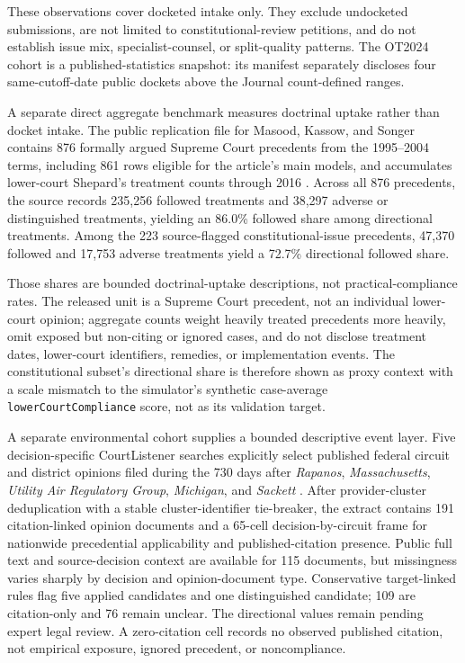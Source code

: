 \documentclass[
    journal=jlc,
    manuscript=research-article,
    year=2026,
  ]{cup-journal}
\newcommand{\jlcite}[1]{\autocite{#1}}
\newcommand{\jlcite}[1]{\citep{#1}}
\begin{document}


These observations cover docketed intake only. They exclude undocketed submissions, are not limited to constitutional-review petitions, and do not establish issue mix, specialist-counsel, or split-quality patterns. The OT2024 cohort is a published-statistics snapshot: its manifest separately discloses four same-cutoff-date public dockets above the Journal count-defined ranges.

A separate direct aggregate benchmark measures doctrinal uptake rather than docket intake. The public replication file for Masood, Kassow, and Songer contains 876 formally argued Supreme Court precedents from the 1995--2004 terms, including 861 rows eligible for the article's main models, and accumulates lower-court Shepard's treatment counts through 2016 \jlcite{MasoodKassowSonger2019,MasoodKassowSongerReplication2019}. Across all 876 precedents, the source records 235,256 followed treatments and 38,297 adverse or distinguished treatments, yielding an 86.0\% followed share among directional treatments. Among the 223 source-flagged constitutional-issue precedents, 47,370 followed and 17,753 adverse treatments yield a 72.7\% directional followed share.

Those shares are bounded doctrinal-uptake descriptions, not practical-compliance rates. The released unit is a Supreme Court precedent, not an individual lower-court opinion; aggregate counts weight heavily treated precedents more heavily, omit exposed but non-citing or ignored cases, and do not disclose treatment dates, lower-court identifiers, remedies, or implementation events. The constitutional subset's directional share is therefore shown as proxy context with a scale mismatch to the simulator's synthetic case-average \texttt{lowerCourtCompliance} score, not as its validation target.

A separate environmental cohort supplies a bounded descriptive event layer. Five decision-specific CourtListener searches explicitly select published federal circuit and district opinions filed during the 730 days after \emph{Rapanos}, \emph{Massachusetts}, \emph{Utility Air Regulatory Group}, \emph{Michigan}, and \emph{Sackett} \jlcite{CourtListener2026}. After provider-cluster deduplication with a stable cluster-identifier tie-breaker, the extract contains 191 citation-linked opinion documents and a 65-cell decision-by-circuit frame for nationwide precedential applicability and published-citation presence. Public full text and source-decision context are available for 115 documents, but missingness varies sharply by decision and opinion-document type. Conservative target-linked rules flag five applied candidates and one distinguished candidate; 109 are citation-only and 76 remain unclear. The directional values remain pending expert legal review. A zero-citation cell records no observed published citation, not empirical exposure, ignored precedent, or noncompliance.
\end{document}
